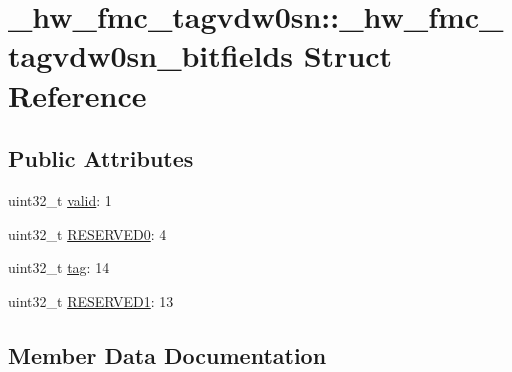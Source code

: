 \hypertarget{struct__hw__fmc__tagvdw0sn_1_1__hw__fmc__tagvdw0sn__bitfields}{}\section{\+\_\+hw\+\_\+fmc\+\_\+tagvdw0sn\+:\+:\+\_\+hw\+\_\+fmc\+\_\+tagvdw0sn\+\_\+bitfields Struct Reference}
\label{struct__hw__fmc__tagvdw0sn_1_1__hw__fmc__tagvdw0sn__bitfields}
\subsection*{Public Attributes}
\begin{DoxyCompactItemize}
\item 
uint32\+\_\+t \hyperlink{struct__hw__fmc__tagvdw0sn_1_1__hw__fmc__tagvdw0sn__bitfields_a4d75b764dacea45017ed95b28177365e}{valid}\+: 1
\item 
uint32\+\_\+t \hyperlink{struct__hw__fmc__tagvdw0sn_1_1__hw__fmc__tagvdw0sn__bitfields_abf6e9d652997fa21fdaf08b8f6f87d97}{R\+E\+S\+E\+R\+V\+E\+D0}\+: 4
\item 
uint32\+\_\+t \hyperlink{struct__hw__fmc__tagvdw0sn_1_1__hw__fmc__tagvdw0sn__bitfields_aaa0d3992bd47585db4d472f0858489db}{tag}\+: 14
\item 
uint32\+\_\+t \hyperlink{struct__hw__fmc__tagvdw0sn_1_1__hw__fmc__tagvdw0sn__bitfields_ad0545656dea6ba04fd4ef14aad083261}{R\+E\+S\+E\+R\+V\+E\+D1}\+: 13
\end{DoxyCompactItemize}


\subsection{Member Data Documentation}
